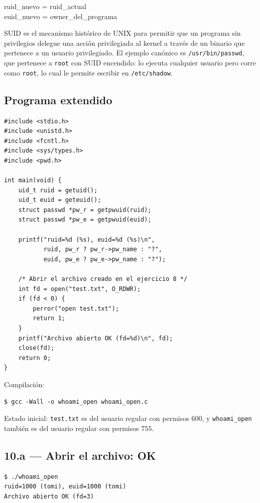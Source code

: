 \documentclass[11pt,a4paper]{article}
\begin{document}
\quad ruid\_nuevo = ruid\_actual\\
\quad euid\_nuevo = owner\_del\_programa

\begin{importante}
SUID es el mecanismo histórico de UNIX para permitir que un programa
sin privilegios delegue una acción privilegiada al kernel a través de
un binario que pertenece a un usuario privilegiado. El ejemplo
canónico es \texttt{/usr/bin/passwd}, que pertenece a \texttt{root}
con SUID encendido: lo ejecuta cualquier usuario pero corre como
\texttt{root}, lo cual le permite escribir en \texttt{/etc/shadow}.
\end{importante}

\subsection*{Programa extendido}

\begin{lstlisting}[style=cstyle]
#include <stdio.h>
#include <unistd.h>
#include <fcntl.h>
#include <sys/types.h>
#include <pwd.h>

int main(void) {
    uid_t ruid = getuid();
    uid_t euid = geteuid();
    struct passwd *pw_r = getpwuid(ruid);
    struct passwd *pw_e = getpwuid(euid);

    printf("ruid=%d (%s), euid=%d (%s)\n",
           ruid, pw_r ? pw_r->pw_name : "?",
           euid, pw_e ? pw_e->pw_name : "?");

    /* Abrir el archivo creado en el ejercicio 8 */
    int fd = open("test.txt", O_RDWR);
    if (fd < 0) {
        perror("open test.txt");
        return 1;
    }
    printf("Archivo abierto OK (fd=%d)\n", fd);
    close(fd);
    return 0;
}
\end{lstlisting}

Compilación:

\begin{lstlisting}[style=shellstyle]
$ gcc -Wall -o whoami_open whoami_open.c
\end{lstlisting}

Estado inicial: \texttt{test.txt} es del usuario regular con permisos
$600$, y \texttt{whoami\_open} también es del usuario regular con
permisos $755$.

\subsection*{10.a --- Abrir el archivo: OK}

\begin{lstlisting}[style=shellstyle]
$ ./whoami_open
ruid=1000 (tomi), euid=1000 (tomi)
Archivo abierto OK (fd=3)
\end{lstlisting}
\end{document}
